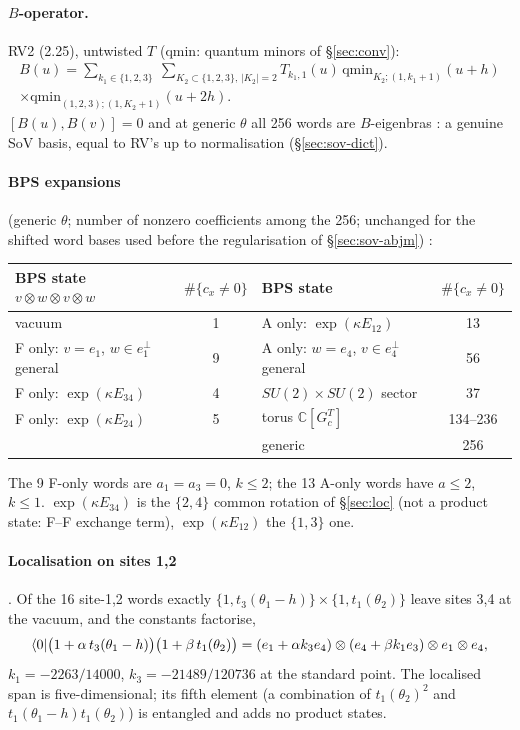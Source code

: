 \paragraph{$B$-operator.} RV2 (2.25), untwisted $T$ (qmin: quantum minors of \S\ref{sec:conv}):
\begin{multline}
 B(u)=\sum_{k_1\in\{1,2,3\}}\ \sum_{K_2\subset\{1,2,3\},\,|K_2|=2}T_{k_1,1}(u)\,\mathrm{qmin}_{K_2;(1,k_1+1)}(u+h)\\
 \times\mathrm{qmin}_{(1,2,3);(1,K_2+1)}(u+2h).
\end{multline}
$[B(u),B(v)]=0$ and at generic $\theta$ all 256 words are $B$-eigenbras \ex: a genuine SoV basis, equal to RV's up to normalisation (\S\ref{sec:sov-dict}).

\paragraph{BPS expansions} (generic $\theta$; number of nonzero coefficients among the 256; unchanged for the shifted word bases used before the regularisation of
\S\ref{sec:sov-abjm}) \ex:
\begin{center}
\begin{tabular}{lc@{\qquad}lc}
\toprule
BPS state $v\otimes w\otimes v\otimes w$ & $\#\{c_x\ne0\}$ & BPS state & $\#\{c_x\ne0\}$\\
\midrule
vacuum & 1 & A only: $\exp(\kappa E_{12})$ & 13\\
F only: $v=e_1$, $w\in e_1^\perp$ general & 9 & A only: $w=e_4$, $v\in e_4^\perp$ general & 56\\
F only: $\exp(\kappa E_{34})$ & 4 & $SU(2)\times SU(2)$ sector & 37\\
F only: $\exp(\kappa E_{24})$ & 5 & torus $\mathbb C[G_c^T]$ & 134--236\\
 & & generic & 256\\
\bottomrule
\end{tabular}
\end{center}
The 9 F-only words are $a_1=a_3=0$, $k\le2$; the 13 A-only words have $a\le2$, $k\le1$. $\exp(\kappa E_{34})$ is the $\{2,4\}$ common rotation of \S\ref{sec:loc} (not a product state: F--F exchange term), $\exp(\kappa E_{12})$ the $\{1,3\}$ one.

\paragraph{Localisation on sites 1,2} \ex. Of the 16 site-1,2 words exactly $\{1,t_3(\theta_1-h)\}\times\{1,t_1(\theta_2)\}$ leave sites 3,4 at the vacuum, and the constants factorise,
\begin{equation}
 \langle0|\big(1+\alpha\,t_3(\theta_1-h)\big)\big(1+\beta\,t_1(\theta_2)\big)=(e_1+\alpha k_3e_4)\otimes(e_4+\beta k_1e_3)\otimes e_1\otimes e_4,
\end{equation}
$k_1=-2263/14000$, $k_3=-21489/120736$ at the standard point. The localised span is five-dimensional; its fifth element (a combination of $t_1(\theta_2)^2$ and $t_1(\theta_1-h)t_1(\theta_2)$) is entangled and adds no product states.

